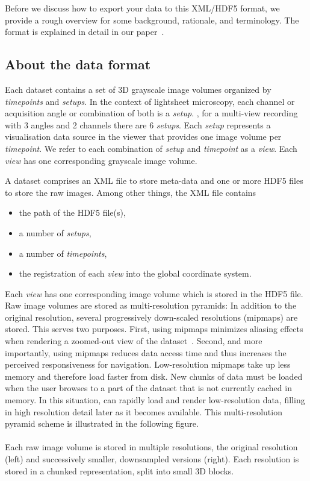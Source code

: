 \documentclass{scrartcl}
\begin{document}
Before we discuss how to export your data to this XML/HDF5 format, we provide a rough overview for some background, rationale, and terminology.
The format is explained in detail in our paper~\cite{arxiv-bdv}.

%
\subsection{About the \Bdv data format}
Each \bdv dataset contains a set of 3D grayscale image volumes organized by \emph{timepoints} and \emph{setups}.
In the context of lightsheet microscopy, each channel or acquisition angle or combination of both is a \emph{setup}.
\Eg, for a multi-view recording with 3 angles and 2 channels there are 6 \emph{setups}.
Each \emph{setup} represents a visualisation data source in the viewer that provides one image volume per \emph{timepoint}.
We refer to each combination of \emph{setup} and \emph{timepoint} as a \emph{view}.
Each \emph{view} has one corresponding grayscale image volume.

A dataset comprises an XML file to store meta-data and one or more HDF5 files to store the raw images.
Among other things, the XML file contains
\begin{itemize}
  \item the path of the HDF5 file(s),
  \item a number of \emph{setups},
  \item a number of \emph{timepoints},
  \item the registration of each \emph{view} into the global coordinate system.
\end{itemize}

Each \emph{view} has one corresponding image volume which is stored in the HDF5 file.
Raw image volumes are stored as multi-resolution pyramids:
In addition to the original resolution, several progressively down-scaled resolutions (mipmaps) are stored.
This serves two purposes.
First, using mipmaps minimizes aliasing effects when rendering a zoomed-out view of the dataset~\cite{Williams:1983it}.
Second, and more importantly, using mipmaps reduces data access time and thus increases the perceived responsiveness for navigation.
Low-resolution mipmaps take up less memory and therefore load faster from disk.
New chunks of data must be loaded when the user browses to a part of the dataset that is not currently cached in memory.
In this situation, \bdv can rapidly load and render low-resolution data, filling in high resolution detail later as it becomes available.
This multi-resolution pyramid scheme is illustrated in the following figure.
\\
\\
Each raw image volume is stored in multiple resolutions, the original resolution (left) and successively smaller, downsampled versions (right).
Each resolution is stored in a chunked representation, split into small 3D blocks.
\end{document}
